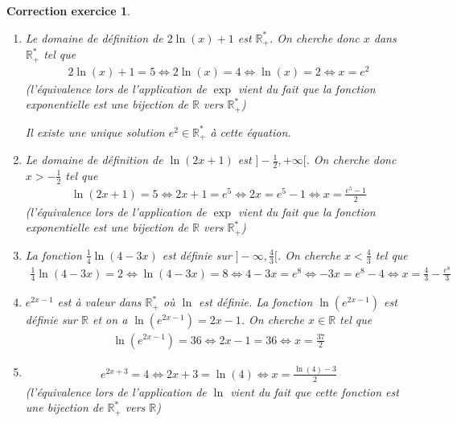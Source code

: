 \documentclass[12pt]{article}
\newtheorem{correction}{\bf Correction exercice}
\newenvironment{cor}{
\begin{correction}\smallskip\normalfont}{\end{correction}
}
\newcommand*{\R}{\mathbb{R}}
\newif\ifcorrige\corrigefalse
\begin{document}
\ifcorrige
\color{magenta}
\begin{cor}
$\qquad$
\begin{enumerate}
\item Le domaine de d\'efinition de $2 \ln (x) + 1$ est $\R^*_+$.
  On cherche donc $x$ dans $\R_+^*$ tel que
  \begin{align*}
    2 \ln (x) + 1 = 5
    \iff
    2 \ln (x) = 4
    \iff
    \ln(x) = 2
    \iff
    x = e^{2}
  \end{align*}
  (l'\'equivalence lors de l'application de $\exp$ vient du fait que la fonction exponentielle
  est une bijection de $\R$ vers $\R_+^*$)

  Il existe une unique solution $e^2 \in \R_+^*$ \`a cette \'equation.

\item Le domaine de d\'efinition de $\ln(2x+1)$ est $]-\frac12 , + \infty[$.
  On cherche donc $x > -\frac12$ tel que
  \begin{align*}
    \ln(2x+1) = 5
    \iff
    2x+1 = e^5
    \iff
    2x = e^5 - 1
    \iff
    x = \frac{e^5 - 1}{2}
  \end{align*}
  (l'\'equivalence lors de l'application de $\exp$ vient du fait que la fonction exponentielle
  est une bijection de $\R$ vers $\R_+^*$)

\item La fonction $\frac14 \ln (4-3x)$ est d\'efinie sur $]-\infty , \frac43 [$.
  On cherche $x < \frac43$ tel que
  \begin{align*}
    \frac14 \ln (4-3x) = 2
    \iff
    \ln (4-3x) = 8
    \iff
    4 - 3x = e^8
    \iff
    -3x = e^8 - 4
    \iff
    x = \frac43 - \frac{e^8}{3}
  \end{align*}

\item $e^{2x-1}$ est \`a valeur dans $\R_+^*$ o\`u $\ln$ est d\'efinie.
  La fonction $\ln( e^{2x-1} )$ est d\'efinie sur $\R$ et on a $\ln( e^{2x-1} ) = 2x-1$.
  On cherche $x \in \R$ tel que
  \begin{align*}
    \ln( e^{2x-1} ) = 36
    \iff
    2x-1 = 36
    \iff
    x = \frac{37}2
  \end{align*}

\item
  \begin{align*}
    e^{2x+3} = 4
    \iff
    2x+3 = \ln(4)
    \iff
    x = \frac{\ln(4) - 3}{2}
  \end{align*}
  (l'\'equivalence lors de l'application de $\ln$ vient du fait que cette fonction
  est une bijection de $\R_+^*$ vers $\R$)


\end{enumerate}
\end{cor}
\end{document}
